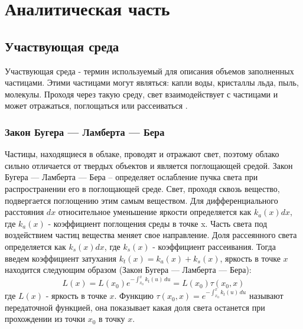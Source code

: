 \chapter{Аналитическая часть}

\section{Участвующая среда}

Участвующая среда - термин используемый для описания объемов заполненных частицами. Этими частицами могут являться: капли воды, кристаллы льда, пыль, молекулы. Проходя через такую среду, свет взаимодействует с частицами и может отражаться, поглощаться или рассеиваться \cite{frostbite}.  

\subsection{Закон Бугера — Ламберта — Бера}
Частицы, находящиеся в облаке, проводят и отражают свет, поэтому облако
сильно отличается от твердых объектов и является поглощающей средой.
Закон Бугера — Ламберта — Бера – определяет ослабление пучка света при распространении его в поглощающей среде. 
Свет, проходя сквозь вещество, подвергается поглощению этим самым веществом. Для дифференциального расстояния $ dx $ относительное уменьшение яркости определяется как $ k_a(x)dx $, где $ k_a(x) $ - коэффициент поглощения среды в точке x. Часть света под воздействием частиц вещества меняет свое направление. Доля рассеянного света определяется как $ k_s(x)dx $, где $ k_s(x) $ - коэффициент рассеивания. Тогда введем коэффициент затухания $ k_t(x)  = k_a(x) + k_s(x) $, яркость в точке $x$ находится следующим образом (Закон Бугера — Ламберта — Бера):  
\begin{equation}
	\label{beers_law}
	L(x) = L(x_0) e^{-\int_{x_0}^{x} k_t(u)\,du}=L(x_0)\tau(x_0, x) 
\end{equation}
где $ L(x) $ - яркость в точке $ x $. Функцию $ \tau(x_0, x) = e^{-\int_{x_0}^{x} k_t(u)\,du}  $ называют передаточной функцией, она показывает какая доля света останется при прохождении из точки $ x_0 $ в точку $ x $.

